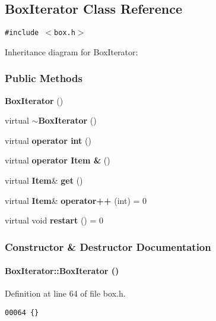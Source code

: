 \subsection{Box\-Iterator  Class Reference}
\label{BoxIterator}
{\tt \#include $<$box.h$>$}

Inheritance diagram for Box\-Iterator:\begin{figure}[H]
\begin{center}
\leavevmode
\setlength{\epsfysize}{2cm}
\end{center}
\end{figure}
\subsubsection*{Public Methods}
\begin{CompactItemize}
\item 
{\bf Box\-Iterator} ()
\item 
virtual {\bf $\sim$Box\-Iterator} ()
\item 
virtual {\bf operator int} ()
\item 
virtual {\bf operator Item \&} ()
\item 
virtual {\bf Item}\& {\bf get} ()
\item 
virtual {\bf Item}\& {\bf operator++} (int) = 0
\item 
virtual void {\bf restart} () = 0
\end{CompactItemize}


\subsubsection{Constructor \& Destructor Documentation}
\label{BoxIterator_a0}
\paragraph{\setlength{\rightskip}{0pt plus 5cm}Box\-Iterator::Box\-Iterator ()\hspace{0.3cm}{\tt  [inline]}}\hfill



Definition at line 64 of file box.h.\small\begin{verbatim}00064 {}
\end{verbatim}\normalsize 
\label{BoxIterator_a1}
